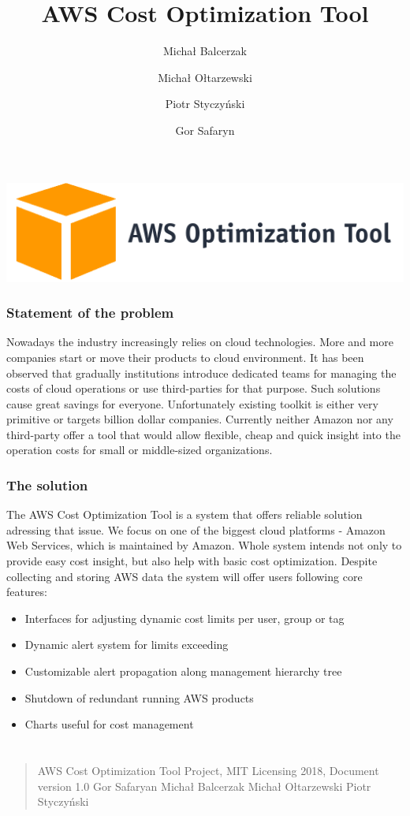 \documentclass[licencjacka,en]{thesisclass}
\author{
  Michał Balcerzak
  \and
  Michał Ołtarzewski
  \and
  Piotr Styczyński
  \and
  Gor Safaryn
}
\title{AWS Cost Optimization Tool}
\begin{document}
\includegraphics[width=\textwidth]{imgs/logo.png}

\subsubsection{Statement of the problem}

Nowadays the industry increasingly relies on cloud technologies. More and more companies start or move their products to cloud environment.
It has been observed that gradually institutions introduce dedicated teams for managing the costs of cloud operations or use third-parties for that purpose. Such solutions cause great savings for everyone.
Unfortunately existing toolkit is either very primitive or targets billion dollar companies. Currently neither Amazon nor any third-party offer a tool that would allow flexible, cheap and quick insight into the operation costs for small or middle-sized organizations.

\subsubsection{The solution}

The AWS Cost Optimization Tool is a system that offers reliable solution adressing that issue. We focus on one of the biggest cloud platforms - Amazon Web Services, which is maintained by Amazon.
Whole system intends not only to provide easy cost insight, but also help with basic cost optimization.
Despite collecting and storing AWS data the system will offer users following core features:

\begin{itemize}
  \item Interfaces for adjusting dynamic cost limits per user, group or tag
  \item Dynamic alert system for limits exceeding
  \item Customizable alert propagation along management hierarchy tree
  \item Shutdown of redundant running AWS products
  \item Charts useful for cost management
\end{itemize}

\hspace{35cm}

\section*{}

\begin{quote}
  AWS Cost Optimization Tool Project, MIT Licensing 2018, Document version 1.0
  \newline
  \newline
  Gor Safaryan
  \newline
  Michał Balcerzak
  \newline
  Michał Ołtarzewski
  \newline
  Piotr Styczyński
  \newline

\end{quote}
\end{document}
